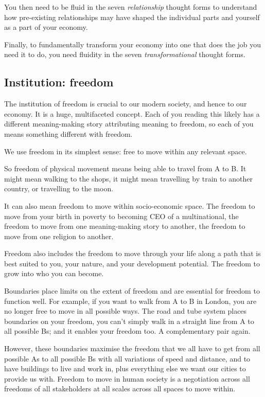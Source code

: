 You then need to be fluid in the seven \emph{relationship} thought forms to understand how pre-existing relationships may have shaped the individual parts and yourself as a part of your economy.


Finally, to fundamentally transform your economy into one that does the job you need it to do, you need fluidity in the seven \emph{transformational} thought forms.
\subsection{Institution: freedom}
The institution of freedom is crucial to our modern society, and hence to our economy. It is a huge, multifaceted concept. Each of you reading this likely has a different meaning\hyp{}making story attributing meaning to freedom, so each of you means something different with freedom.


We use freedom in its simplest sense: free to move within any relevant space. 


So freedom of physical movement means being able to travel from A to B. It might mean walking to the shops, it might mean travelling by train to another country, or travelling to the moon. 


It can also mean freedom to move within socio-economic space. The freedom to move from your birth in poverty to becoming CEO of a multinational, the freedom to move from one meaning\hyp{}making story to another, the freedom to move from one religion to another. 


Freedom also includes the freedom to move through your life along a path that is best suited to you, your nature, and your development potential. The freedom to grow into who you can become.


Boundaries place limits on the extent of freedom and are essential for freedom to function well. For example, if you want to walk from A to B in London, you are no longer free to move in all possible ways. The road and tube system places boundaries on your freedom, you can't simply walk in a straight line from A to all possible Bs; and it enables your freedom too. A complementary pair again. 


However, these boundaries maximise the freedom that we all have to get from all possible As to all possible Bs with all variations of speed and distance, and to have buildings to live and work in, plus everything else we want our cities to provide us with. Freedom to move in human society is a negotiation across all freedoms of all stakeholders at all scales across all spaces to move within.



